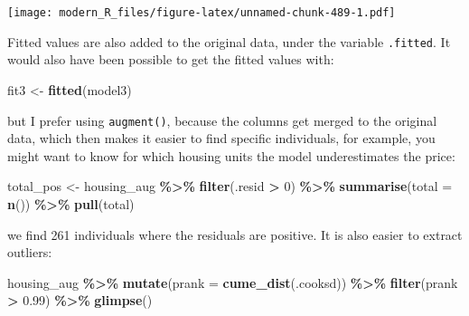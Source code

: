 \documentclass[
]{article}
\newenvironment{Shaded}{\begin{snugshade}}{\end{snugshade}}
\newcommand{\DataTypeTok}[1]{\textcolor[rgb]{0.13,0.29,0.53}{#1}}
\newcommand{\DecValTok}[1]{\textcolor[rgb]{0.00,0.00,0.81}{#1}}
\newcommand{\FloatTok}[1]{\textcolor[rgb]{0.00,0.00,0.81}{#1}}
\newcommand{\KeywordTok}[1]{\textcolor[rgb]{0.13,0.29,0.53}{\textbf{#1}}}
\newcommand{\NormalTok}[1]{#1}
\newcommand{\OperatorTok}[1]{\textcolor[rgb]{0.81,0.36,0.00}{\textbf{#1}}}
\newcommand{\StringTok}[1]{\textcolor[rgb]{0.31,0.60,0.02}{#1}}
\begin{document}
\texttt{[image: modern\_R\_files/figure-latex/unnamed-chunk-489-1.pdf]}

Fitted values are also added to the original data, under the variable \texttt{.fitted}. It would also have
been possible to get the fitted values with:

\begin{Shaded}
\begin{Highlighting}[]
\NormalTok{fit3 \textless{}{-}}\StringTok{ }\KeywordTok{fitted}\NormalTok{(model3)}
\end{Highlighting}
\end{Shaded}

but I prefer using \texttt{augment()}, because the columns get merged to the original data, which then
makes it easier to find specific individuals, for example, you might want to know for which housing
units the model underestimates the price:

\begin{Shaded}
\begin{Highlighting}[]
\NormalTok{total\_pos \textless{}{-}}\StringTok{ }\NormalTok{housing\_aug }\OperatorTok{\%\textgreater{}\%}
\StringTok{  }\KeywordTok{filter}\NormalTok{(.resid }\OperatorTok{\textgreater{}}\StringTok{ }\DecValTok{0}\NormalTok{) }\OperatorTok{\%\textgreater{}\%}
\StringTok{  }\KeywordTok{summarise}\NormalTok{(}\DataTypeTok{total =} \KeywordTok{n}\NormalTok{()) }\OperatorTok{\%\textgreater{}\%}
\StringTok{  }\KeywordTok{pull}\NormalTok{(total)}
\end{Highlighting}
\end{Shaded}

we find 261 individuals where the residuals are positive. It is also easier to
extract outliers:

\begin{Shaded}
\begin{Highlighting}[]
\NormalTok{housing\_aug }\OperatorTok{\%\textgreater{}\%}
\StringTok{  }\KeywordTok{mutate}\NormalTok{(}\DataTypeTok{prank =} \KeywordTok{cume\_dist}\NormalTok{(.cooksd)) }\OperatorTok{\%\textgreater{}\%}
\StringTok{  }\KeywordTok{filter}\NormalTok{(prank }\OperatorTok{\textgreater{}}\StringTok{ }\FloatTok{0.99}\NormalTok{) }\OperatorTok{\%\textgreater{}\%}
\StringTok{  }\KeywordTok{glimpse}\NormalTok{()}
\end{Highlighting}
\end{Shaded}
\end{document}
